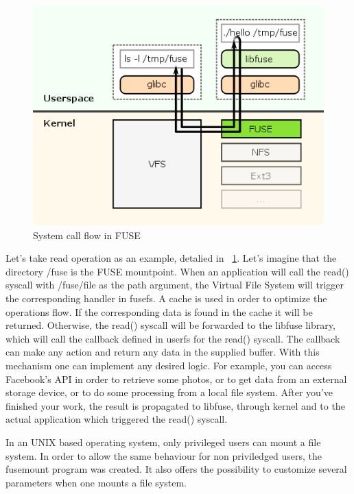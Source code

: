         \begin{figure}[h]
           \begin{center}
               \includegraphics[width=\textwidth]{theoretical/fuse.png}
            \end{center}
            \caption{System call flow in FUSE \cite{FuseArch}}
            \label{fig:fuse}
        \end{figure}

        Let's take read operation as an example, detalied in ~\ref{fig:fuse}. Let's imagine that the directory /fuse is the FUSE mountpoint. When an application will call the read() syscall with /fuse/file as the path argument, the Virtual File System will trigger the corresponding handler in fusefs. A cache is used in order to optimize the operations flow. If the corresponding data is found in the cache it will be returned. Otherwise, the read() syscall will be forwarded to the libfuse library, which will call the callback defined in userfs for the read() syscall. The callback can make any action and return any data in the supplied buffer. With this mechanism one can implement any desired logic. For example, you can access Facebook's API in order to retrieve some photos, or to get data from an external storage device, or to do some processing from a local file system. After you've finished your work, the result is propagated to libfuse, through kernel and to the actual application which triggered the read() syscall.

        In an UNIX based operating system, only privileged users can mount a file system. In order to allow the same behaviour for non priviledged users, the fusemount program was created. It also offers the possibility to customize several parameters when one mounts a file system.

